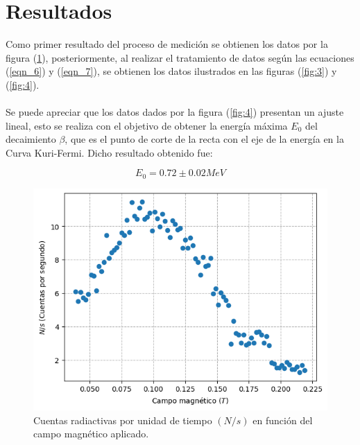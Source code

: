 \documentclass[10pt,twocolumns,letterpaper]{article}
\begin{document}
\section{Resultados}
Como primer resultado del proceso de medición se obtienen los datos por la figura (\ref{fig:2}), posteriormente, al realizar el tratamiento de datos según las ecuaciones (\ref{eqn_6}) y (\ref{eqn_7}), se obtienen los datos ilustrados en las figuras (\ref{fig:3}) y (\ref{fig:4}).\\ \\
Se puede apreciar que los datos dados por la figura (\ref{fig:4}) presentan un ajuste lineal, esto se realiza con el objetivo de obtener la energía máxima $E_0$ del decaimiento $\beta$, que es el punto de corte de la recta con el eje de la energía en la Curva Kuri-Fermi. Dicho resultado obtenido fue:

$$ E_0 = 0.72\pm 0.02 MeV$$
\begin{figure}[h]
    \centering
    \includegraphics[scale=0.6]{Datos tomados.png}
    \caption{Cuentas radiactivas por unidad de tiempo $(N/s)$ en función del campo magnético aplicado.}
    \label{fig:2}
\end{figure} 
\end{document}
